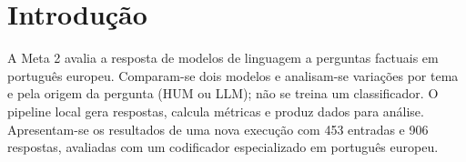 \section{Introdução}

A Meta 2 avalia a resposta de modelos de linguagem a perguntas factuais em português europeu. Comparam-se dois modelos e analisam-se variações por tema e pela origem da pergunta (HUM ou LLM); não se treina um classificador. O pipeline local gera respostas, calcula métricas e produz dados para análise. Apresentam-se os resultados de uma nova execução com 453 entradas e 906 respostas, avaliadas com um codificador especializado em português europeu.
